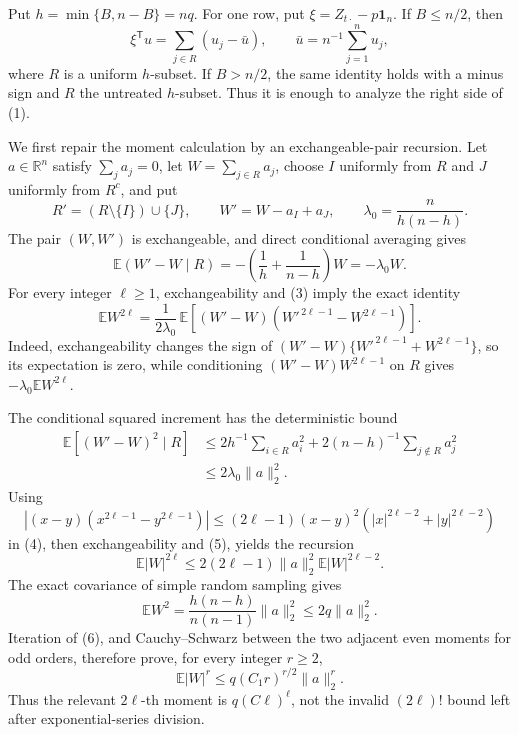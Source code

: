 Put \(h=\min\{B,n-B\}=nq\).  For one row, put \(\xi=Z_{t\cdot}-p\mathbf 1_n\).  If \(B\le n/2\), then
\[
 \xi^{\mathsf T}u=\sum_{j\in R}(u_j-\bar u),
 \qquad \bar u=n^{-1}\sum_{j=1}^n u_j,
 \tag{1}
\]
where \(R\) is a uniform \(h\)-subset.  If \(B>n/2\), the same identity holds with a minus sign and \(R\) the untreated \(h\)-subset.  Thus it is enough to analyze the right side of (1).

We first repair the moment calculation by an exchangeable-pair recursion.  Let \(a\in\mathbb R^n\) satisfy \(\sum_j a_j=0\), let \(W=\sum_{j\in R}a_j\), choose \(I\) uniformly from \(R\) and \(J\) uniformly from \(R^c\), and put
\[
 R'=(R\setminus\{I\})\cup\{J\},
 \qquad W'=W-a_I+a_J,
 \qquad \lambda_0=\frac{n}{h(n-h)}.
 \tag{2}
\]
The pair \((W,W')\) is exchangeable, and direct conditional averaging gives
\[
 \mathbb E(W'-W\mid R)
 =-\left(\frac1h+\frac1{n-h}\right)W
 =-\lambda_0W.
 \tag{3}
\]
For every integer \(\ell\ge1\), exchangeability and (3) imply the exact identity
\[
 \mathbb EW^{2\ell}
 =\frac1{2\lambda_0}\,
 \mathbb E\!\left[(W'-W)
       (W'^{\,2\ell-1}-W^{2\ell-1})\right].
 \tag{4}
\]
Indeed, exchangeability changes the sign of
\((W'-W)\{W'^{\,2\ell-1}+W^{2\ell-1}\}\), so its expectation is zero, while conditioning
\((W'-W)W^{2\ell-1}\) on \(R\) gives
\(-\lambda_0\mathbb EW^{2\ell}\).

The conditional squared increment has the deterministic bound
\[
 \begin{aligned}
 \mathbb E\!\left[(W'-W)^2\mid R\right]
 &\le
 2h^{-1}\sum_{i\in R}a_i^2+
 2(n-h)^{-1}\sum_{j\notin R}a_j^2\\
 &\le2\lambda_0\lVert a\rVert_2^2.
 \end{aligned}
 \tag{5}
\]
Using
\[
 |(x-y)(x^{2\ell-1}-y^{2\ell-1})|
 \le(2\ell-1)(x-y)^2
       (|x|^{2\ell-2}+|y|^{2\ell-2})
\]
in (4), then exchangeability and (5), yields the recursion
\[
 \mathbb E|W|^{2\ell}
 \le2(2\ell-1)\lVert a\rVert_2^2
       \mathbb E|W|^{2\ell-2}.
 \tag{6}
\]
The exact covariance of simple random sampling gives
\[
 \mathbb EW^2
 =\frac{h(n-h)}{n(n-1)}\lVert a\rVert_2^2
 \le2q\lVert a\rVert_2^2.
\]
Iteration of (6), and Cauchy--Schwarz between the two adjacent even moments for odd orders, therefore prove, for every integer \(r\ge2\),
\[
 \mathbb E|W|^r
 \le q(C_1r)^{r/2}\lVert a\rVert_2^r.
 \tag{7}
\]
Thus the relevant \(2\ell\)-th moment is \(q(C\ell)^\ell\), not the invalid
\((2\ell)!\) bound left after exponential-series division.

